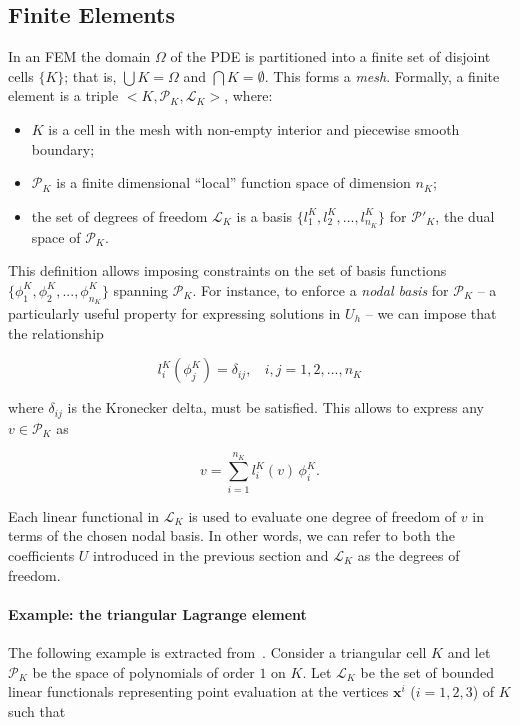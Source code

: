 \subsection{Finite Elements}
In an FEM the domain $\Omega$ of the PDE is partitioned into a finite set of disjoint cells $\lbrace K \rbrace$; that is, $\bigcup K = \Omega$ and $\bigcap K = \emptyset$. This forms a {\em mesh}. Formally, a finite element is a triple ${<}K,\mathcal{P}_K,\mathcal{L}_K{>}$, where:
\begin{itemize}
\item $K$ is a cell in the mesh with non-empty interior and piecewise smooth boundary;
\item $\mathcal{P}_K$ is a finite dimensional ``local'' function space of dimension $n_K$;
\item the set of degrees of freedom $\mathcal{L}_K$ is a basis $\lbrace l_1^K, l_2^K, ..., l_{n_K}^K\rbrace$ for $\mathcal{P}'_K$, the dual space of $\mathcal{P}_K$. 
\end{itemize}
This definition allows imposing constraints on the set of basis functions $\lbrace \phi_1^K, \phi_2^K, ..., \phi_{n_K}^K\rbrace$ spanning $\mathcal{P}_K$. For instance, to enforce a {\em nodal basis} for $\mathcal{P}_K$ -- a particularly useful property for expressing solutions in $U_h$ -- we can impose that the relationship

\begin{equation}
l_i^K(\phi_j^K) = \delta_{ij},\ \ \ \ i,j = 1,2,...,n_K
\end{equation}

where $\delta_{ij}$ is the Kronecker delta, must be satisfied. This allows to express any $v \in \mathcal{P}_K$ as

\begin{equation}
v = \sum_{i=1}^{n_K} l_i^K(v) \, \phi_i^K.
\end{equation}

Each linear functional in $\mathcal{L}_K$ is used to evaluate one degree of freedom of $v$ in terms of the chosen nodal basis. In other words, we can refer to both the coefficients $U$ introduced in the previous section and $\mathcal{L}_K$ as the degrees of freedom.

\paragraph{Example: the triangular Lagrange element}
The following example is extracted from~\cite{Fenics}. Consider a triangular cell $K$ and let $\mathcal{P}_K$ be the space of polynomials of order $1$ on $K$. Let $\mathcal{L}_K$ be the set of bounded linear functionals representing point evaluation at the vertices $\boldsymbol{x}^i$ ($i=1,2,3$) of $K$ such that

